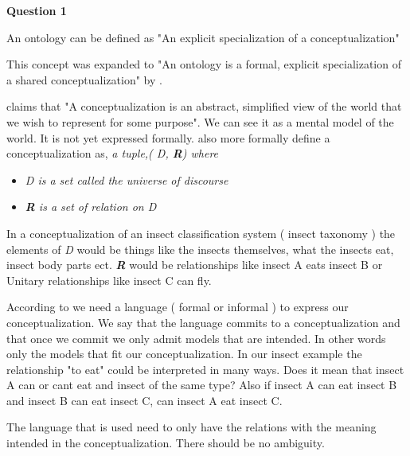 \documentclass[12pt,a4paper]{article}
\begin{document}
\textbf{Question 1}
\newline



An ontology can be defined as "An explicit specialization of a conceptualization" \cite{Gruber1993}


This concept was expanded to "An ontology is a formal, explicit specialization of a shared conceptualization" by \cite{Studer1998}.

\cite{Genesereth1987} claims that "A conceptualization is an abstract, simplified view of the world that we wish to represent for some purpose". We can see it as a mental model of the world. It is not yet expressed formally. \cite{Genesereth1987} also more formally define a conceptualization as, \emph{a tuple,( D, \textbf{R}) where}
\begin{itemize}
\item \emph{D is a set called the universe of discourse }
\item \emph{\textbf{R} is a set of relation on D}
\end{itemize}

In a conceptualization of an insect classification system ( insect taxonomy ) the elements of \emph{D} would be things like the insects themselves, what the insects eat, insect body parts ect. \emph{\textbf{R}} would be relationships like insect A eats insect B or Unitary relationships like insect C can fly.

According to \cite{GuObSt09} we need a language ( formal or informal ) to express our conceptualization. We say that the language commits to a conceptualization and that once we commit we only admit models that are intended\citep[p.8]{GuObSt09}. In other words only the models that fit our conceptualization. In our insect example the relationship "to eat" could be interpreted in many ways. Does it mean that insect A can or cant eat and insect of the same type? Also if insect A can eat insect B and insect B can eat insect C, can insect A eat insect C.

The language that is used need to only have the relations with the meaning intended in the conceptualization. There should be no ambiguity. 
\end{document}
